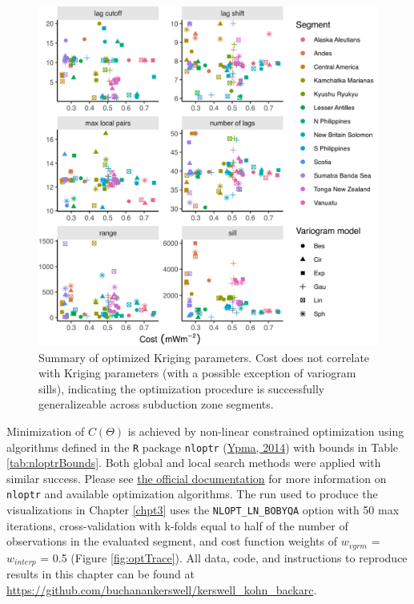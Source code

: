 \begin{figure}[htbp]

{\centering \includegraphics[width=1\linewidth,]{assets/figs/chpt3/vgrmSummary} 

}

\caption[Summary of optimized variogram models]{Summary of optimized Kriging parameters. Cost does not correlate with Kriging parameters (with a possible exception of variogram sills), indicating the optimization procedure is successfully generalizeable across subduction zone segments.}\label{fig:vgrmSummaryPlot}
\end{figure}

Minimization of \(C(\Theta)\) is achieved by non-linear constrained optimization using algorithms defined in the \texttt{R} package \texttt{nloptr} (\protect\hyperlink{ref-ypma2014}{Ypma, 2014}) with bounds in Table \ref{tab:nloptrBounds}. Both global and local search methods were applied with similar success. Please see \href{https://nlopt.readthedocs.io/en/latest/NLopt_Introduction/}{the official documentation} for more information on \texttt{nloptr} and available optimization algorithms. The run used to produce the visualizations in Chapter \ref{chpt3} uses the \texttt{NLOPT\_LN\_BOBYQA} option with 50 max iterations, cross-validation with k-folds equal to half of the number of observations in the evaluated segment, and cost function weights of \(w_{vgrm}\) = \(w_{interp}\) = 0.5 (Figure \ref{fig:optTrace}). All data, code, and instructions to reproduce results in this chapter can be found at \url{https://github.com/buchanankerswell/kerswell_kohn_backarc}.



